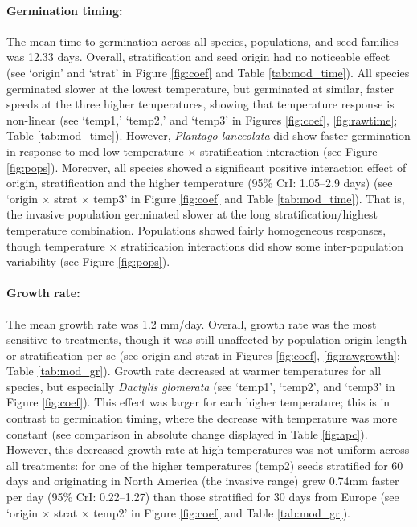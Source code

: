 \documentclass[12pt]{article}\usepackage[]{graphicx}\usepackage[]{color}
\begin{document}
	\paragraph{Germination timing:} The mean time to germination across all species, populations, and seed families was 12.33 days.   Overall, stratification and seed origin had no noticeable effect (see `origin' and `strat' in Figure \ref{fig:coef} and Table \ref{tab:mod_time}). All species germinated slower at the lowest temperature, but germinated at similar, faster speeds at the three higher temperatures, showing that temperature response is non-linear  (see `temp1,' `temp2,' and `temp3' in Figures \ref{fig:coef}, \ref{fig:rawtime}; Table \ref{tab:mod_time}). However, \textit{Plantago lanceolata} did show faster germination in response to med-low temperature $\times$ stratification interaction (see Figure \ref{fig:pops}).  Moreover, all species showed a significant positive interaction effect of origin, stratification and the higher temperature (95\% CrI: 1.05--2.9 days) (see `origin $\times$ strat $\times$ temp3' in Figure \ref{fig:coef} and Table \ref{tab:mod_time}). That is, the invasive population germinated slower at the long stratification/highest temperature combination. Populations showed fairly homogeneous responses, though temperature $\times$ stratification interactions did show some inter-population variability (see Figure \ref{fig:pops}). 
	\paragraph{Growth rate:} The mean growth rate was 1.2 mm/day. Overall, growth rate was the most sensitive to treatments, though it was still unaffected by population origin length or stratification per se (see origin and strat in Figures \ref{fig:coef}, \ref{fig:rawgrowth}; Table \ref{tab:mod_gr}). Growth rate decreased at warmer temperatures for all species, but especially \textit{Dactylis glomerata} (see `temp1', `temp2', and `temp3' in Figure \ref{fig:coef}). This effect was larger for each higher temperature; this is in contrast to germination timing, where the decrease with temperature was more constant (see comparison in absolute change displayed in Table \ref{fig:apc}). However, this decreased growth rate at high temperatures was not uniform across all treatments: for one of the higher temperatures (temp2) seeds stratified for 60 days and originating in North America (the invasive range) grew 0.74mm faster per day (95\% CrI: 0.22--1.27) than those stratified for 30 days from Europe (see `origin $\times$ strat $\times$ temp2' in Figure \ref{fig:coef} and Table \ref{tab:mod_gr}). 
\end{document}
